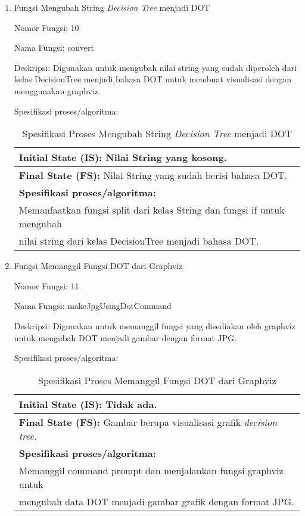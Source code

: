 \begin{enumerate}
	
	\item Fungsi Mengubah String \textsl{Decision Tree} menjadi DOT
	
	Nomor Fungsi: 10
	
	Nama Fungsi: convert
	
	Deskripsi: Digunakan untuk mengubah nilai string yang sudah diperoleh dari kelas DecisionTree menjadi bahasa DOT untuk membuat visualisasi dengan menggunakan graphviz.
	
	Spesifikasi proses/algoritma:
	\begin{table}[h]
	\caption{Spesifikasi Proses Mengubah String \textsl{Decision Tree} menjadi DOT}
	\label{table:spesifikasiDOT}
	\centering
	\begin{tabular}{|l|}
	\hline
	\textbf{Initial State (IS): }Nilai String yang kosong. 			\\ \hline
	\textbf{Final State (FS): }Nilai String yang sudah berisi bahasa DOT. \\ \hline
	\textbf{Spesifikasi proses/algoritma:}																 \\
	Memanfaatkan fungsi split dari kelas String dan fungsi if untuk mengubah \\
	nilai string dari kelas DecisionTree menjadi bahasa DOT.\\ \hline
	\end{tabular}
	\end{table}
	
	
	
	\item Fungsi Memanggil Fungsi DOT dari Graphviz
	
	Nomor Fungsi: 11
	
	Nama Fungsi: makeJpgUsingDotCommand
	
	Deskripsi: Digunakan untuk memanggil fungsi yang disediakan oleh graphviz untuk mengubah DOT menjadi gambar dengan format JPG.
	
	Spesifikasi proses/algoritma:
	\begin{table}[h]
	\caption{Spesifikasi Proses Memanggil Fungsi DOT dari Graphviz}
	\label{table:spesifikasiFungsiDOT}
	\centering
	\begin{tabular}{|l|}
	\hline
	\textbf{Initial State (IS): }Tidak ada. 			\\ \hline
	\textbf{Final State (FS): }Gambar berupa visualisasi grafik \textsl{decision tree}. \\ \hline
	\textbf{Spesifikasi proses/algoritma:}																 \\
	Memanggil command prompt dan menjalankan fungsi graphviz untuk \\
	mengubah data DOT menjadi gambar grafik dengan format JPG.\\ \hline
	\end{tabular}
	\end{table}
\end{enumerate}

